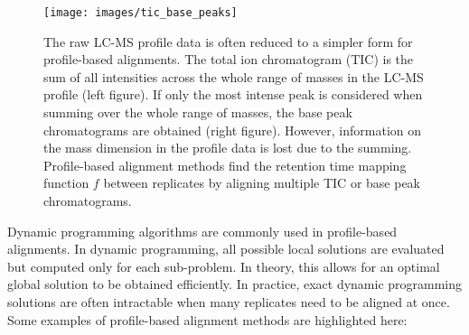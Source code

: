 \begin{figure}[h]
\noindent \begin{centering}
\texttt{[image: images/tic\_base\_peaks]}
\par\end{centering}

\caption{\emph{\label{fig:profile-based}}The raw LC-MS profile data is often reduced to a simpler form for profile-based alignments. The total ion chromatogram (TIC) is the sum of all intensities across the whole range of masses in the LC-MS profile (left figure). If only the most intense peak is considered when summing over the whole range of masses, the base peak chromatograms are obtained (right figure). However, information on the mass dimension in the profile data is lost due to the summing. Profile-based alignment methods find the retention time mapping function $f$ between replicates by aligning multiple TIC or base peak chromatograms.} \end{figure}

Dynamic programming algorithms are commonly used in profile-based alignments. In dynamic programming, all possible local solutions are evaluated but computed only for each sub-problem. In theory, this allows for an optimal global solution to be obtained efficiently. In practice, exact dynamic programming solutions are often intractable when many replicates need to be aligned at once. Some examples of profile-based alignment methods are highlighted here:

